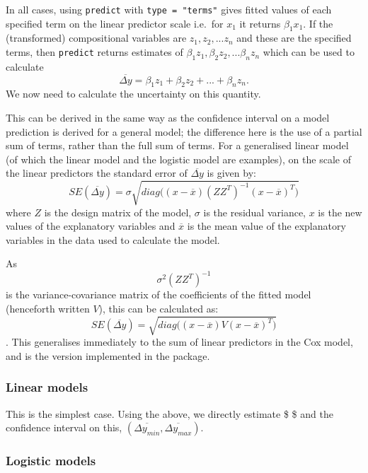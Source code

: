 \documentclass[
]{article}
\begin{document}
In all cases, using \texttt{predict} with \texttt{type\ =\ "terms"}
gives fitted values of each specified term on the linear predictor scale
i.e.~for \(x_1\) it returns \(\beta_1 x_1\). If the (transformed)
compositional variables are \(z_1, z_2, ... z_n\) and these are the
specified terms, then \texttt{predict} returns estimates of
\(\beta_1 z_1, \beta_2 z_2, ... \beta_n z_n\) which can be used to
calculate
\[ \overline{\Delta y} = \beta_1 z_1 + \beta_2 z_2 + ... + \beta_n z_n.\]
We now need to calculate the uncertainty on this quantity.

This can be derived in the same way as the confidence interval on a
model prediction is derived for a general model; the difference here is
the use of a partial sum of terms, rather than the full sum of terms.
For a generalised linear model (of which the linear model and the
logistic model are examples), on the scale of the linear predictors the
standard error of \(\overline{\Delta y}\) is given by:
\[ SE(\overline{\Delta y}) = \sigma \sqrt{diag\Big((x - \overline{x})(ZZ^{T})^{-1}(x-\overline{x})^T\Big)} \]
where \(Z\) is the design matrix of the model, \(\sigma\) is the
residual variance, \(x\) is the new values of the explanatory variables
and \(\overline{x}\) is the mean value of the explanatory variables in
the data used to calculate the model.

As \[ \sigma ^2 (ZZ^{T})^{-1} \] is the variance-covariance matrix of
the coefficients of the fitted model (henceforth written \(V\)), this
can be calculated as:
\[ SE(\overline{\Delta y}) =  \sqrt{diag\Big((x - \overline{x})V(x-\overline{x})^T\Big)} \].
This generalises immediately to the sum of linear predictors in the Cox
model, and is the version implemented in the package.

\hypertarget{linear-models}{%
\subsubsection{Linear models}\label{linear-models}}

This is the simplest case. Using the above, we directly estimate \$
 \$ and the confidence interval on this,
\((\overline{\Delta y_{min}}, \overline{\Delta y_{max}})\).

\hypertarget{logistic-models}{%
\subsubsection{Logistic models}\label{logistic-models}}
\end{document}
